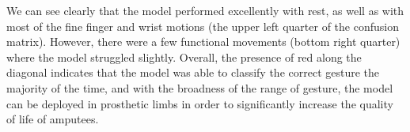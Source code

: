 We can see clearly that the model performed excellently with rest, as well as with most of the fine finger and wrist motions (the upper left quarter of the confusion matrix). However, there were a few functional movements (bottom right quarter) where the model struggled slightly. Overall, the presence of red along the diagonal indicates that the model was able to classify the correct gesture the majority of the time, and with the broadness of the range of gesture, the model can be deployed in prosthetic limbs in order to significantly increase the quality of life of amputees.

